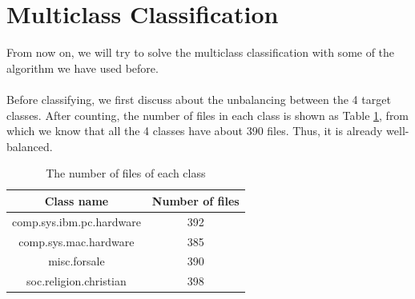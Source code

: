\documentclass{article}
\begin{document}
\section{Multiclass Classification}\label{sec:multi}
From now on, we will try to solve the multiclass classification with some of the algorithm we have used before.\\
\\
Before classifying, we first discuss about the unbalancing between the 4 target classes. After counting, the number of files in each class is shown as Table \ref{tb:filenum}, from which we know that all the 4 classes have about 390 files. Thus, it is already well-balanced.\\
\begin{table}
\begin{center}
\caption{The number of files of each class}
\label{tb:filenum}
\begin{tabular}{|c|c|}
\hline
Class name&Number of files\\
\hline
comp.sys.ibm.pc.hardware&392\\
comp.sys.mac.hardware&385\\
misc.forsale&390\\
soc.religion.christian&398\\
\hline
\end{tabular}
\end{center}
\end{table}
\end{document}
